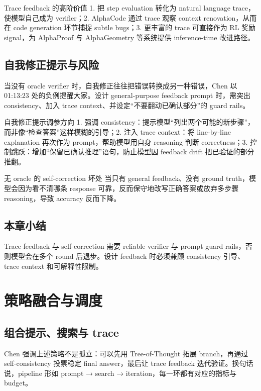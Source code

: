 \documentclass[a4paper]{article}
\begin{document}
\begin{importantbox}{Trace feedback 的高阶价值}
1. 把 step evaluation 转化为 natural language trace，使模型自己成为 verifier；2. AlphaCode 通过 trace 观察 context renovation，从而在 code generation 环节捕捉 subtle bugs；3. 更丰富的 trace 可直接作为 RL 奖励 signal，为 AlphaProof 与 AlphaGeometry 等系统提供 inference-time 改进路径。
\end{importantbox}

\subsection{自我修正提示与风险}
当没有 oracle verifier 时，自我修正往往把错误转换成另一种错误，Chen 以 01:13:23 处的负例提醒大家。设计 general-purpose feedback prompt 时，需突出 consistency、加入 trace context、并设定“不要翻动已确认部分”的 guard rails。

\begin{knowledgebox}{自我修正提示调参方向}
1. 强调 consistency：提示模型“列出两个可能的新步骤”，而非像“检查答案”这样模糊的引导；2. 注入 trace context：将 line-by-line explanation 再次作为 prompt，帮助模型用自身 reasoning 判断 correctness；3. 控制跳跃：增加“保留已确认推理”语句，防止模型因 feedback drift 把已验证的部分推翻。
\end{knowledgebox}

\begin{warningbox}{无 oracle 的 self-correction 坏处}
当只有 general feedback、没有 ground truth，模型会因为看不清哪条 response 可靠，反而保守地改写正确答案或放弃多步骤 reasoning，导致 accuracy 反而下降。
\end{warningbox}

\subsection{本章小结}
Trace feedback 与 self-correction 需要 reliable verifier 与 prompt guard rails，否则模型会在多个 round 后退步。设计 feedback 时必须兼顾 consistency 引导、trace context 和可解释性限制。

\section{策略融合与调度}

\subsection{组合提示、搜索与 trace}
Chen 强调上述策略不是孤立：可以先用 Tree-of-Thought 拓展 branch，再通过 self-consistency 投票稳定 final answer，最后让 trace feedback 迭代验证。换句话说，pipeline 形如 prompt → search → iteration，每一环都有对应的指标与 budget。
\end{document}
